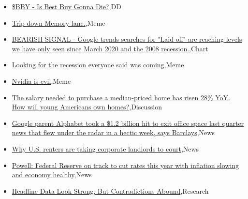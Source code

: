 \documentclass{article}%
\begin{document}
%
\begin{itemize}%
\item%
\href{https://reddit.com/r/wallstreetbets/comments/1ajbjk6/bby\_is\_best\_buy\_gonna\_die/}{\$BBY - Is Best Buy Gonna Die?},DD%
\item%
\href{https://reddit.com/r/wallstreetbets/comments/1aja643/trip\_down\_memory\_lane/}{Trip down Memory lane.},Meme%
\item%
\href{https://reddit.com/r/wallstreetbets/comments/1aj7y0g/bearish\_signal\_google\_trends\_searches\_for\_laid/}{BEARISH SIGNAL - Google trends searches for "Laid off" are reaching levels we have only seen since March 2020 and the 2008 recession.},Chart%
\item%
\href{https://reddit.com/r/wallstreetbets/comments/1aj7qkn/looking\_for\_the\_recession\_everyone\_said\_was\_coming/}{Looking for the recession everyone said was coming},Meme%
\item%
\href{https://reddit.com/r/wallstreetbets/comments/1aj7mof/nvidia\_is\_evil/}{Nvidia is evil},Meme%
\item%
\href{https://reddit.com/r/StockMarket/comments/1aiokic/the\_salary\_needed\_to\_purchase\_a\_medianpriced\_home/}{The salary needed to purchase a median-priced home has risen 28\% YoY. How will young Americans own homes?},Discussion%
\item%
\href{https://reddit.com/r/StockMarket/comments/1ailrdu/google\_parent\_alphabet\_took\_a\_12\_billion\_hit\_to/}{Google parent Alphabet took a \$1.2 billion hit to exit office space last quarter  news that flew under the radar in a hectic week, says Barclays},News%
\item%
\href{https://reddit.com/r/Economics/comments/1aj6o3r/why\_us\_renters\_are\_taking\_corporate\_landlords\_to/}{Why U.S. renters are taking corporate landlords to court},News%
\item%
\href{https://reddit.com/r/Economics/comments/1aj5dmp/powell\_federal\_reserve\_on\_track\_to\_cut\_rates\_this/}{Powell: Federal Reserve on track to cut rates this year with inflation slowing and economy healthy},News%
\item%
\href{https://reddit.com/r/Economics/comments/1aj331e/headline\_data\_look\_strong\_but\_contradictions/}{Headline Data Look Strong, But Contradictions Abound},Research%
\end{itemize}%
\end{document}
